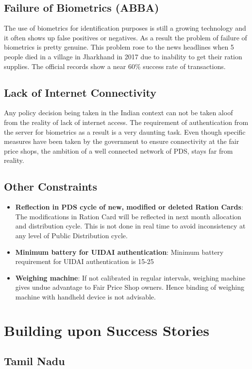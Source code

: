 \documentclass[a4paper,12pt]{extarticle}
\begin{document}
\subsection{Failure of Biometrics (ABBA)}
The use of biometrics for identification purposes is still a growing technology and it often shows up false positives or negatives. As a result the problem of failure of biometrics is pretty genuine. 
This problem rose to the news headlines when 5 people died in a village in Jharkhand in 2017 due to inability to get their ration supplies.
The official records show a near 60\% success rate of transactions.

\subsection{Lack of Internet Connectivity}
Any policy decision being taken in the Indian context can not be taken aloof from the reality of lack of internet access. The requirement of authentication from the server for biometrics as a result is a very daunting task. Even though specific measures have been taken by the government to ensure connectivity at the fair price shops, the ambition of a well connected network of PDS, stays far from reality.


\subsection{Other Constraints}
\begin{itemize}
\item \textbf{Reflection in PDS cycle of new, modified or deleted Ration Cards}: The modifications in Ration Card will be reflected in next month allocation and distribution cycle. This is not done in real time to avoid inconsistency at any level of Public Distribution cycle. 
\item \textbf{Minimum battery for UIDAI authentication}: Minimum battery requirement for UIDAI authentication is 15-25%
\item \textbf{Weighing machine}: If not calibrated in regular intervals, weighing machine gives undue advantage to Fair Price Shop owners. Hence binding of weighing machine with handheld device is not advisable.
\end{itemize}

\section{Building upon Success Stories}
\subsection{Tamil Nadu}
\end{document}
